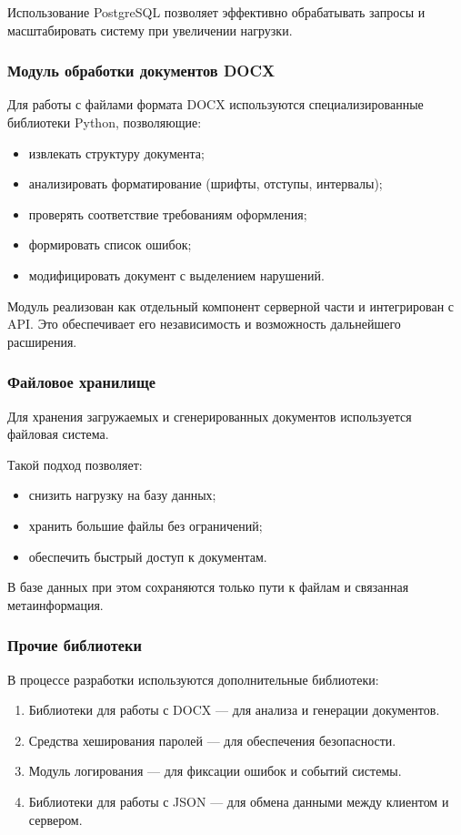 Использование PostgreSQL позволяет эффективно обрабатывать запросы и масштабировать систему при увеличении нагрузки.

\subsubsection{Модуль обработки документов DOCX}

Для работы с файлами формата DOCX используются специализированные библиотеки Python, позволяющие:
\begin{itemize}
	\item извлекать структуру документа;
	\item анализировать форматирование (шрифты, отступы, интервалы);
	\item проверять соответствие требованиям оформления;
	\item формировать список ошибок;
	\item модифицировать документ с выделением нарушений.
\end{itemize}

Модуль реализован как отдельный компонент серверной части и интегрирован с API. Это обеспечивает его независимость и возможность дальнейшего расширения.

\subsubsection{Файловое хранилище}

Для хранения загружаемых и сгенерированных документов используется файловая система.

Такой подход позволяет:
\begin{itemize}
	\item снизить нагрузку на базу данных;
	\item хранить большие файлы без ограничений;
	\item обеспечить быстрый доступ к документам.
\end{itemize}

В базе данных при этом сохраняются только пути к файлам и связанная метаинформация.

\subsubsection{Прочие библиотеки}

В процессе разработки используются дополнительные библиотеки:

\begin{enumerate}
	\item Библиотеки для работы с DOCX — для анализа и генерации документов.
	\item Средства хеширования паролей — для обеспечения безопасности.
	\item Модуль логирования — для фиксации ошибок и событий системы.
	\item Библиотеки для работы с JSON — для обмена данными между клиентом и сервером.
\end{enumerate}

